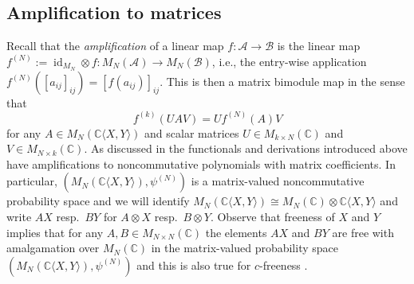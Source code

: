 \documentclass[12pt]{amsart}
\DeclareMathOperator{\id}{\operatorname{id}}
\newcommand\IC{{\mathbb C}}
\newcommand{\alg}[1]{\mathcal{#1}}
\theoremstyle{definition}
\numberwithin{equation}{section}
\begin{document}
\subsection{Amplification to matrices}
Recall that the \emph{amplification} of a linear map $f:\alg{A}\to \alg{B}$
is the linear map
$f^{(N)}:= \id_{M_N}\otimes f:M_N(\alg{A})\to M_N(\alg{B})$,
i.e., the entry-wise application $f^{(N)}([a_{ij}]_{ij}) = [f(a_{ij})]_{ij}$.
This is then a matrix bimodule map in the sense that
\[
  f^{(k)}(UAV) = Uf^{(N)}(A)V
\]
for any $A\in M_N(\IC\langle X,Y\rangle)$ and scalar matrices
$U\in M_{k\times N}(\mathbb{C})$ and $V\in M_{N\times k}(\IC)$.
As discussed in \cite{LehnerSzpojankowski:2023:freeint1} the functionals
and derivations introduced above have amplifications to noncommutative
polynomials with matrix coefficients.
In particular,
$(M_N(\IC\langle X,Y\rangle),\psi^{(N)})$
is  a matrix-valued noncommutative probability space
and we will
identify $M_N(\IC\langle X,Y\rangle)
\cong M_N(\mathbb{C})\otimes \IC\langle X,Y\rangle$
and write  $AX$ resp.\ $BY$ for $A\otimes X$ resp.\
$B\otimes Y$.
 Observe that freeness of $X$ and $Y$ implies that for any $A,B\in
 M_{N\times N}(\mathbb{C}) $ the elements $AX$ and $BY$ are free
 with amalgamation over $M_{N}(\mathbb{C})$ in the matrix-valued probability
 space $(M_N(\IC\langle X,Y\rangle),\psi^{(N)})$
 and this is also true for $c$-freeness \cite{Mlotkowski:2002:operator,Popa:2009:multilinear,PopaVinnikov:2013:functions}.


		
\end{document}
